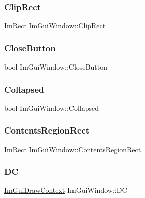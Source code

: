 \subsubsection{\texorpdfstring{Clip\+Rect}{ClipRect}}
{\footnotesize\ttfamily \hyperlink{struct_im_rect}{Im\+Rect} Im\+Gui\+Window\+::\+Clip\+Rect}

\hypertarget{struct_im_gui_window_afef9f9e2a79626e28acd459e4cfe83e7}{}\label{struct_im_gui_window_afef9f9e2a79626e28acd459e4cfe83e7} 
\subsubsection{\texorpdfstring{Close\+Button}{CloseButton}}
{\footnotesize\ttfamily bool Im\+Gui\+Window\+::\+Close\+Button}

\hypertarget{struct_im_gui_window_a04e6b533b2401d1c7e78b47e31538e7b}{}\label{struct_im_gui_window_a04e6b533b2401d1c7e78b47e31538e7b} 
\subsubsection{\texorpdfstring{Collapsed}{Collapsed}}
{\footnotesize\ttfamily bool Im\+Gui\+Window\+::\+Collapsed}

\hypertarget{struct_im_gui_window_ac0d04b743eab132900c1ededc8eab9f6}{}\label{struct_im_gui_window_ac0d04b743eab132900c1ededc8eab9f6} 
\subsubsection{\texorpdfstring{Contents\+Region\+Rect}{ContentsRegionRect}}
{\footnotesize\ttfamily \hyperlink{struct_im_rect}{Im\+Rect} Im\+Gui\+Window\+::\+Contents\+Region\+Rect}

\hypertarget{struct_im_gui_window_a3a20c68996093058481ae8e174258a04}{}\label{struct_im_gui_window_a3a20c68996093058481ae8e174258a04} 
\subsubsection{\texorpdfstring{DC}{DC}}
{\footnotesize\ttfamily \hyperlink{struct_im_gui_draw_context}{Im\+Gui\+Draw\+Context} Im\+Gui\+Window\+::\+DC}

